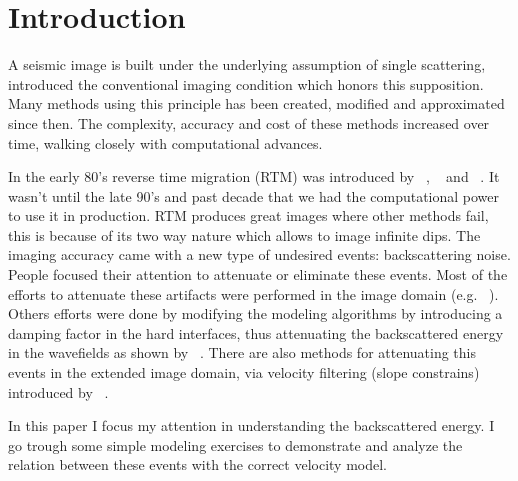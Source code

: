 \section{Introduction}

A seismic image is built under the underlying assumption of single 
scattering,  ~\cite{claerbout:467} introduced the conventional imaging condition which honors this supposition.
 Many methods using this principle has been created, modified and approximated since then. 
The complexity, accuracy and cost of these methods increased over time, walking closely with computational
advances.  

In the early 80's reverse time migration (RTM) was introduced by ~\cite{baysal:1514}, ~\cite{whitmore:382} and ~\cite{GPR:GPR413}.
It wasn't until the late 90's and past decade that we had the computational power to use it in production. RTM produces great images where
other methods fail, this is because of its two way nature which allows to image infinite dips. The imaging accuracy came with
a new type of undesired events: backscattering noise. People focused their attention to attenuate or eliminate these events.
 Most of the efforts to attenuate these artifacts were performed in the image domain (e.g. ~\cite{guitton:s19}). Others efforts
  were done by modifying the modeling algorithms by introducing
a damping factor in the hard interfaces, thus attenuating the backscattered energy in the wavefields as shown by ~\cite{fletcher:2049}. There 
are also methods for attenuating this events in the extended image domain, via velocity filtering (slope constrains) introduced by ~\cite{kaelin:3125}.


In this paper I focus my attention in understanding the backscattered energy. I go trough some simple
modeling exercises to demonstrate and analyze the relation between these events with the correct velocity model.
